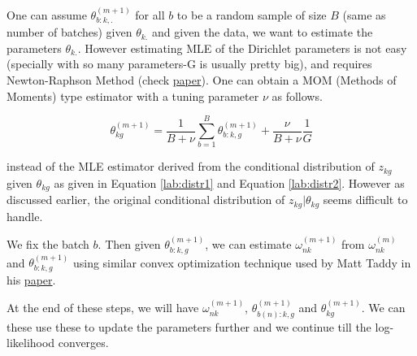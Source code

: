\documentclass[]{article}
\begin{document}
One can assume \(\theta^{(m+1)}_{b:k,.}\) for all \(b\) to be a random
sample of size \(B\) (same as number of batches) given \(\theta_{k.}\)
and given the data, we want to estimate the parameters \(\theta_{k.}\).
However estimating MLE of the Dirichlet parameters is not easy
(specially with so many parameters-G is usually pretty big), and
requires Newton-Raphson Method (check
\href{http://www.msr-waypoint.com/en-us/um/people/minka/papers/dirichlet/minka-dirichlet.pdf}{paper}).
One can obtain a MOM (Methods of Moments) type estimator with a tuning
parameter \(\nu\) as follows.

\[ \theta^{(m+1)}_{kg} = \frac{1}{B+\nu} \sum_{b=1}^{B} \theta^{(m+1)}_{b:k,g}  + \frac{\nu}{B+\nu} \frac{1}{G} \]

instead of the MLE estimator derived from the conditional distribution
of \(z_{kg}\) given \(\theta_{kg}\) as given in Equation
\ref{lab:distr1} and Equation \ref{lab:distr2}. However as discussed
earlier, the original conditional distribution of
\(z_{kg} | \theta_{kg}\) seems difficult to handle.

We fix the batch \(b\). Then given \(\theta^{(m+1)}_{b:k,g}\), we can
estimate \(\omega^{(m+1)}_{nk}\) from \(\omega^{(m)}_{nk}\) and
\(\theta^{(m+1)}_{b:k,g}\) using similar convex optimization technique
used by Matt Taddy in his
\href{http://arxiv.org/pdf/1109.4518v3.pdf}{paper}.

At the end of these steps, we will have \(\omega^{(m+1)}_{nk}\),
\(\theta^{(m+1)}_{b(n):k,g}\) and \(\theta^{(m+1)}_{kg}\). We can these
use these to update the parameters further and we continue till the
log-likelihood converges.
\end{document}
